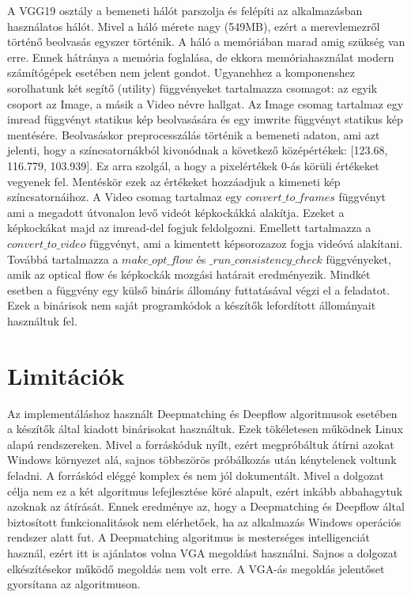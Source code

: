 \documentclass[12pt, a4paper, oneside]{book}
\theoremstyle{tetel}
\newcommand\secro[1]{%
	\addcontentsline{tce}{section}{\protect\makebox[2.8em][l]{\thesection.}#1}}
\newcommand\secen[1]{%
	 \addcontentsline{tcen}{section}{\protect\makebox[2.8em][l]{\thesection.}#1}}
\begin{document}
A VGG19 osztály a bemeneti hálót parszolja és felépíti az alkalmazásban használatos hálót. Mivel a háló mérete nagy (549MB), ezért a merevlemezről történő beolvasás egyszer történik. A háló a memóriában marad amig szükség van erre. Ennek hátránya a memória foglalása, de ekkora memóriahasználat modern számítógépek esetében nem jelent gondot.
\newline
\indent
Ugyanehhez a komponenshez sorolhatunk két segítő (utility) függvényeket tartalmazza csomagot: az egyik csoport az Image, a másik a Video névre hallgat.
\newline
\indent
Az Image csomag tartalmaz egy imread függvényt statikus kép beolvasására és egy imwrite függvényt statikus kép mentésére. Beolvasáskor preprocesszálás történik a bemeneti adaton, ami azt jelenti, hogy a színcsatornákból kivonódnak a következő középértékek: [123.68, 116.779, 103.939]. Ez arra szolgál, a hogy a pixelértékek 0-ás körüli értékeket vegyenek fel. Mentéskör ezek az értékeket hozzáadjuk a kimeneti kép színcsatornáihoz.
\newline
\indent
A Video csomag tartalmaz egy \(convert\_to\_frames\) függvényt ami a megadott útvonalon levő videót képkockákká alakítja. Ezeket a képkockákat majd az imread-del fogjuk feldolgozni. Emellett tartalmazza a \(convert\_to\_video\) függvényt, ami a kimentett képsorozazoz fogja videóvá alakítani. Továbbá tartalmazza a \(make\_opt\_flow\) és \(\_run\_consistency\_check\) függvényeket, amik az optical flow és képkockák mozgási határait eredményezik. Mindkét esetben a függvény egy külső bináris állomány futtatásával végzi el a feladatot. Ezek a binárisok nem saját programkódok a készítők lefordított állományait használtuk fel\cite{34}.

\section{Limitációk}
\secro{Limitații}
\secen{Limitations}
Az implementáláshoz használt Deepmatching és Deepflow algoritmusok esetében a készítők által kiadott binárisokat használtuk. Ezek tökéletesen működnek Linux alapú rendszereken. Mivel a forráskóduk nyílt, ezért megpróbáltuk átírni azokat Windows környezet alá, sajnos többszörös próbálkozás után kénytelenek voltunk feladni. A forráskód eléggé komplex és nem jól dokumentált. Mivel a dolgozat célja nem ez a két algoritmus lefejlesztése köré alapult, ezért inkább abbahagytuk azoknak az átírását. Ennek eredménye az, hogy a Deepmatching és Deepflow által biztosított funkcionalitások nem elérhetőek, ha az alkalmazás Windows operációs rendszer alatt fut.
\newline
\indent
A Deepmatching algoritmus is mesterséges intelligenciát használ, ezért itt is ajánlatos volna VGA megoldást használni. Sajnos a dolgozat elkészítésekor működő megoldás nem volt erre. A VGA-ás megoldás jelentőset gyorsítana az algoritmuson.
\end{document}
